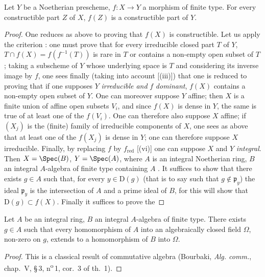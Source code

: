 \begin{corollary}[1.8.5]
\label{IV.1.8.5}
Let $Y$ be a Noetherian prescheme, $f:X\to Y$ a morphism of finite type.
For every constructible part $Z$ of $X$, $f(Z)$ is a constructible part of $Y$.
\end{corollary}


\begin{proof}
One reduces as above to proving that $f(X)$ is constructible.
Let us apply the criterion : one must prove that for every irreducible closed part $T$ of $Y$, $T\cap f(X)=f(f^{-1}(T))$ is rare in $T$ or contains a non-empty open subset of $T$; taking a subscheme of $Y$ whose underlying space is $T$  and considering its inverse image by $f$, one sees finally (taking into account [(iii)]) that one is reduced to proving that if one supposes $Y$ \emph{irreducible and} $f$ \emph{dominant}, $f(X)$ contains a non-empty open subset of $Y$.
One can moreover suppose $Y$ affine; then $X$ is a finite union of affine open subsets $V_i$, and since $f(X)$ is dense in $Y$, the same is true of at least one of the $f(V_i)$.
One can therefore also suppose $X$ affine; if $(X_j)$ is the (finite) family of irreducible components of $X$, one sees as above that at least one of the $f(X_j)$ is dense in $Y$; one can therefore suppose $X$ irreducible.
Finally, by replacing $f$ by $f_{\mathrm{red}}$ [(vi)] one can suppose $X$ and $Y$ \emph{integral}.
Then $X=\Spec(B)$, $Y=\Spec(A)$, where $A$ is an integral Noetherian ring, $B$ an integral $A$-algebra of finite type containing $A$ .
It suffices to show that there exists $g\in A$ such that, for every $y\in\mathrm{D}(g)$ (that is to say such that $g\notin\mathfrak{p}_y$) the ideal $\mathfrak{p}_y$ is the intersection of $A$ and a prime ideal of $B$, for this will show that $\mathrm{D}(g)\subset f(X)$.
Finally it suffices to prove the
\end{proof}

\begin{lemma}[1.8.5.1]
\label{IV.1.8.5.1}
Let $A$ be an integral ring, $B$ an integral $A$-algebra of finite type.
There exists $g\in A$ such that every homomorphism of $A$ into an algebraically closed field $\Omega$, non-zero on $g$, extends to a homomorphism of $B$ into $\Omega$.
\end{lemma}

\begin{proof}
This is a classical result of commutative algebra (Bourbaki, \emph{Alg. comm.}, chap.~V, \S\,3, n\textsuperscript{o}\,1, cor.~3 of th.~1).
\end{proof}

